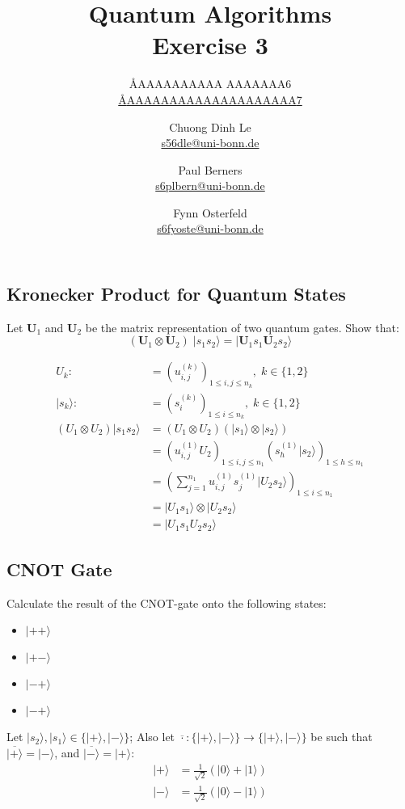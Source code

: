 \documentclass{article}
\title{Quantum Algorithms \\ Exercise 3}
\author{
  \AA{AAAAAAAAAA AAAAAAA}{6} \\ \href{mailto:\AA{AAAAAAAAAAAAAAAAAAAA}{7}}{\AA{AAAAAAAAAAAAAAAAAAAA}{7}} \and
  Chuong Dinh Le \\ \href{mailto:s56dle@uni-bonn.de}{s56dle@uni-bonn.de} \and
  Paul Berners \\ \href{mailto:s6plbern@uni-bonn.de}{s6plbern@uni-bonn.de} \and
  Fynn Osterfeld \\ \href{mailto:s6fyoste@uni-bonn.de}{s6fyoste@uni-bonn.de}
}
\begin{document}
  \maketitle

  \setcounter{section}{3}
  \subsection{Kronecker Product for Quantum States}
  \begin{centerframebox}
    Let $\mathbf{U}_1$ and $\mathbf{U}_2$ be the matrix representation of two quantum gates. Show that:
    \[ (\mathbf{U}_{1}\otimes\mathbf{U}_{2})\; |s_{1}s_{2}\rangle = |\mathbf{U}_{1}s_{1}\mathbf{U}_{2}s_{2}\rangle \]
  \end{centerframebox}

  \begin{align*}
      U_k :&= \left(u_{i, j}^{(k)}\right)_{1\leq i, j\leq n_k},\; k\in \{1, 2\}\\
      |s_k\rangle :&= \left(s_i^{(k)}\right)_{1\leq i \leq n_k},\; k\in \{1, 2\}\\
      (U_1 \otimes U_2)|s_1s_2\rangle &= (U_1 \otimes U_2)(|s_1\rangle \otimes |s_2\rangle)\\
      &= \left(u_{i, j}^{(1)}U_2\right)_{1\leq i, j\leq n_1}  \left(s_h^{(1)}|s_2\rangle\right)_{1\leq h\leq n_1}\\
      &= \left(\sum_{j=1}^{n_1}u_{i, j}^{(1)}s_j^{(1)}|U_2s_2\rangle\right)_{1\leq i\leq n_1}\\
      &= |U_1s_1\rangle \otimes |U_2s_2\rangle\\
      &= |U_1s_1U_2s_2\rangle
  \end{align*}

  \subsection{CNOT Gate}
  \begin{centerframebox}
    Calculate the result of the CNOT-gate onto the following states:
    \begin{itemize}
      \item $|++\rangle$
      \item $|+-\rangle$
      \item $|-+\rangle$
      \item $|-+\rangle$
    \end{itemize}
  \end{centerframebox}

  Let $|s_2\rangle, |s_1\rangle \in \{|+\rangle, |-\rangle\}$; Also let $\overline{\cdot}: \{|+\rangle, |-\rangle\} \rightarrow \{|+\rangle, |-\rangle\}$ be such that $\overline{|+\rangle} = |-\rangle$, and $\overline{|-\rangle} = |+\rangle$:
  \begin{align*}
    |+\rangle &= \frac{1}{\sqrt{2}}(|0\rangle + |1\rangle)\\
    |-\rangle &= \frac{1}{\sqrt{2}}(|0\rangle - |1\rangle)
  \end{align*}
\end{document}
